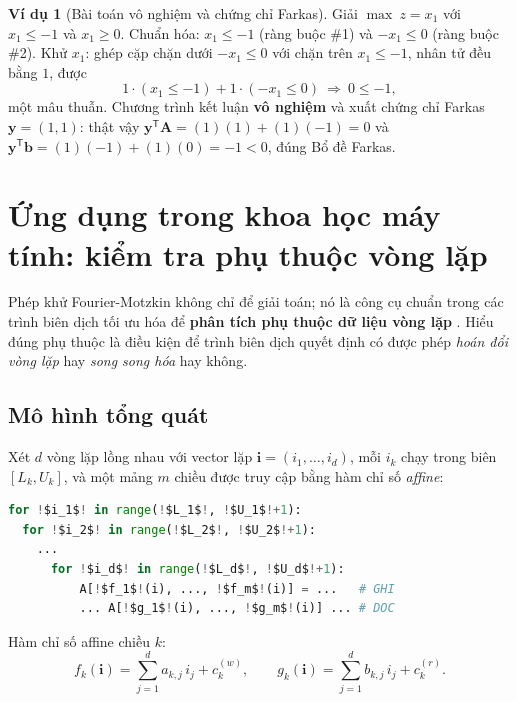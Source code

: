 \documentclass[12pt,a4paper]{article}
\theoremstyle{definition}
\newtheorem{example}{Ví dụ}[section]
\newcommand{\vb}{\mathbf{b}}
\newcommand{\vy}{\mathbf{y}}
\newcommand{\mA}{\mathbf{A}}
\newcommand{\T}{^{\mathsf T}}
\begin{document}
\begin{example}[Bài toán vô nghiệm và chứng chỉ Farkas]
Giải $\max\ z = x_1$ với $x_1 \le -1$ và $x_1 \ge 0$. Chuẩn hóa: $x_1 \le -1$
(ràng buộc \#1) và $-x_1 \le 0$ (ràng buộc \#2). Khử $x_1$: ghép cặp chặn dưới
$-x_1\le0$ với chặn trên $x_1\le-1$, nhân tử đều bằng $1$, được
\[
    1\cdot(x_1 \le -1) + 1\cdot(-x_1 \le 0)\ \Longrightarrow\ 0 \le -1,
\]
một mâu thuẫn. Chương trình kết luận \textbf{vô nghiệm} và xuất chứng chỉ
Farkas $\vy = (1, 1)$: thật vậy $\vy\T\mA = (1)(1) + (1)(-1) = 0$ và
$\vy\T\vb = (1)(-1) + (1)(0) = -1 < 0$, đúng Bổ đề Farkas.
\end{example}

\section{Ứng dụng trong khoa học máy tính: kiểm tra phụ thuộc vòng lặp}

Phép khử Fourier-Motzkin không chỉ để giải toán; nó là công cụ chuẩn trong các
trình biên dịch tối ưu hóa để \textbf{phân tích phụ thuộc dữ liệu vòng lặp}
\cite{allen2002}. Hiểu đúng phụ thuộc là điều kiện để trình biên dịch quyết
định có được phép \emph{hoán đổi vòng lặp} hay \emph{song song hóa} hay không.

\subsection{Mô hình tổng quát}

Xét $d$ vòng lặp lồng nhau với vector lặp $\mathbf{i} = (i_1,\ldots,i_d)$,
mỗi $i_k$ chạy trong biên $[L_k, U_k]$, và một mảng $m$ chiều được truy cập
bằng hàm chỉ số \emph{affine}:

\begin{lstlisting}[language=Python,
    caption={Mô hình vòng lặp lồng nhau tổng quát},
    escapechar=!]
for !$i_1$! in range(!$L_1$!, !$U_1$!+1):
  for !$i_2$! in range(!$L_2$!, !$U_2$!+1):
    ...
      for !$i_d$! in range(!$L_d$!, !$U_d$!+1):
          A[!$f_1$!(i), ..., !$f_m$!(i)] = ...   # GHI
          ... A[!$g_1$!(i), ..., !$g_m$!(i)] ... # DOC
\end{lstlisting}

Hàm chỉ số affine chiều $k$:
\[
    f_k(\mathbf{i}) = \sum_{j=1}^{d} a_{k,j}\,i_j + c_k^{(w)}, \qquad
    g_k(\mathbf{i}) = \sum_{j=1}^{d} b_{k,j}\,i_j + c_k^{(r)}.
\]
\end{document}

